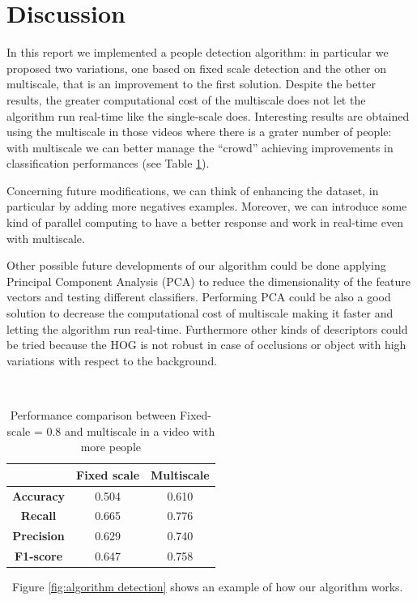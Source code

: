 \documentclass[a4paper,letterpaper, 11pt, onecolumn]{article} %
\begin{document}
\section{Discussion}\label{discussion}
In this report we implemented a people detection algorithm: in particular we proposed two variations, one based on fixed scale detection and the other on multiscale, that is an improvement to the first solution. Despite the better results, the greater computational cost of the multiscale does not let the algorithm run real-time like the single-scale does. 
Interesting results are obtained using the multiscale in those videos where there is a grater number of people: with multiscale we can better manage the ``crowd'' achieving improvements in classification performances (see Table \ref{tab:performance compairson}).


Concerning future modifications, we can think of enhancing the dataset, in particular by adding more negatives examples. Moreover, we can introduce some kind of parallel computing to have a better response and work in real-time even with multiscale. 

Other possible future developments of our algorithm could be done applying Principal Component Analysis (PCA) to reduce the dimensionality of the feature vectors and testing different classifiers. Performing PCA could be also a good solution to decrease the computational cost of multiscale making it faster and letting the algorithm run real-time. Furthermore other kinds of descriptors could be tried because the HOG is not robust in case of occlusions or object with high variations with respect to the background.

\
\begin{table}[h!]
\centering
\begin{tabular}{c||c|c}
&\textbf{Fixed scale} & \textbf{Multiscale}\\
\hline \hline 
\textbf{Accuracy} &0.504 & 0.610\\
\textbf{Recall} &0.665  & 0.776\\
\textbf{Precision} & 0.629 &  0.740\\
\textbf{F1-score} & 0.647& 0.758\\
\end{tabular}
\caption{Performance comparison between Fixed-scale = 0.8 and multiscale in a video with more people}
\label{tab:performance compairson}
\end{table}
\
Figure \ref{fig:algorithm detection} shows an example of how our algorithm works.
\end{document}
